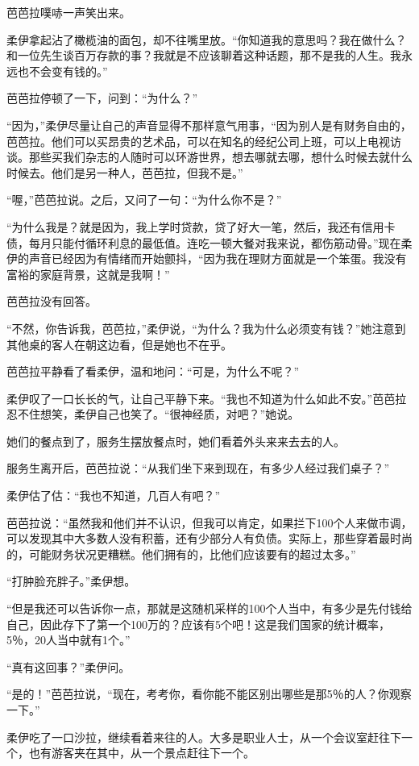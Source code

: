 芭芭拉噗哧一声笑出来。

柔伊拿起沾了橄榄油的面包，却不往嘴里放。“你知道我的意思吗？我在做什么？和一位先生谈百万存款的事？我就是不应该聊着这种话题，那不是我的人生。我永远也不会变有钱的。”

芭芭拉停顿了一下，问到：“为什么？”

“因为，”柔伊尽量让自己的声音显得不那样意气用事，“因为别人是有财务自由的，芭芭拉。他们可以买昂贵的艺术品，可以在知名的经纪公司上班，可以上电视访谈。那些买我们杂志的人随时可以环游世界，想去哪就去哪，想什么时候去就什么时候去。他们是另一种人，芭芭拉，但我不是。”

“喔，”芭芭拉说。之后，又问了一句：“为什么你不是？”

“为什么我是？就是因为，我上学时贷款，贷了好大一笔，然后，我还有信用卡债，每月只能付循环利息的最低值。连吃一顿大餐对我来说，都伤筋动骨。”现在柔伊的声音已经因为有情绪而开始颤抖，“因为我在理财方面就是一个笨蛋。我没有富裕的家庭背景，这就是我啊！”

芭芭拉没有回答。

“不然，你告诉我，芭芭拉，”柔伊说，“为什么？我为什么必须变有钱？”她注意到其他桌的客人在朝这边看，但是她也不在乎。

芭芭拉平静看了看柔伊，温和地问：“可是，为什么不呢？”

柔伊叹了一口长长的气，让自己平静下来。“我也不知道为什么如此不安。”芭芭拉忍不住想笑，柔伊自己也笑了。“很神经质，对吧？”她说。

她们的餐点到了，服务生摆放餐点时，她们看着外头来来去去的人。

服务生离开后，芭芭拉说：“从我们坐下来到现在，有多少人经过我们桌子？”

柔伊估了估：“我也不知道，几百人有吧？”

芭芭拉说：“虽然我和他们并不认识，但我可以肯定，如果拦下100个人来做市调，可以发现其中大多数人没有积蓄，还有少部分人有负债。实际上，那些穿着最时尚的，可能财务状况更糟糕。他们拥有的，比他们应该要有的超过太多。”

“打肿脸充胖子。”柔伊想。

“但是我还可以告诉你一点，那就是这随机采样的100个人当中，有多少是先付钱给自己，因此存下了第一个100万的？应该有5个吧！这是我们国家的统计概率，5％，20人当中就有1个。”

“真有这回事？”柔伊问。

“是的！”芭芭拉说，“现在，考考你，看你能不能区别出哪些是那5％的人？你观察一下。”

柔伊吃了一口沙拉，继续看着来往的人。大多是职业人士，从一个会议室赶往下一个，也有游客夹在其中，从一个景点赶往下一个。

